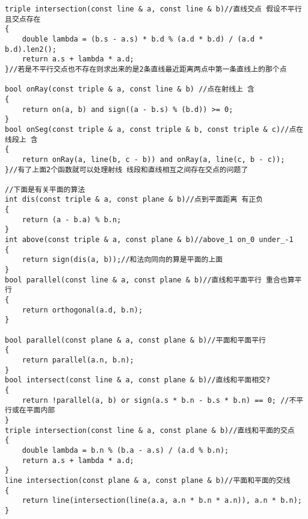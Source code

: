 \begin{lstlisting}
triple intersection(const line & a, const line & b)//直线交点 假设不平行 且交点存在
{
    double lambda = (b.s - a.s) * b.d % (a.d * b.d) / (a.d * b.d).len2();
    return a.s + lambda * a.d;
}//若是不平行交点也不存在则求出来的是2条直线最近距离两点中第一条直线上的那个点

bool onRay(const triple & a, const line & b) //点在射线上 含
{
    return on(a, b) and sign((a - b.s) % (b.d)) >= 0;
}
bool onSeg(const triple & a, const triple & b, const triple & c)//点在线段上 含
{
    return onRay(a, line(b, c - b)) and onRay(a, line(c, b - c));
}//有了上面2个函数就可以处理射线 线段和直线相互之间存在交点的问题了

//下面是有关平面的算法
int dis(const triple & a, const plane & b)//点到平面距离 有正负
{
    return (a - b.a) % b.n;
}
int above(const triple & a, const plane & b)//above_1 on_0 under_-1
{
    return sign(dis(a, b));//和法向同向的算是平面的上面
}
bool parallel(const line & a, const plane & b)//直线和平面平行 重合也算平行
{
    return orthogonal(a.d, b.n);
}

bool parallel(const plane & a, const plane & b)//平面和平面平行
{
    return parallel(a.n, b.n);
}
bool intersect(const line & a, const plane & b)//直线和平面相交?
{
    return !parallel(a, b) or sign(a.s * b.n - b.s * b.n) == 0; //不平行或在平面内部
}
triple intersection(const line & a, const plane & b)//直线和平面的交点
{
    double lambda = b.n % (b.a - a.s) / (a.d % b.n);
    return a.s + lambda * a.d;
}
line intersection(const plane & a, const plane & b)//平面和平面的交线
{
    return line(intersection(line(a.a, a.n * b.n * a.n)), a.n * b.n);
}
\end{lstlisting}

